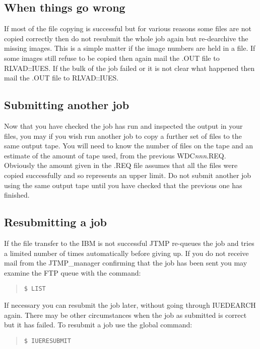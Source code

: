 \subsection {When things go wrong}

If most of the file copying is successful but
for various reasons some files are not copied correctly then do not resubmit the
whole job again but re-dearchive the missing images. This is a simple matter
if the image numbers are held in a file. If some images still refuse
to be copied then again mail the .OUT file to RLVAD::IUES.
If the bulk of the job failed or it is not clear what happened then mail the
.OUT file to RLVAD::IUES.

\subsection {Submitting another job}

Now that you have checked the job has run and inspected the output in your
files, you may if you wish run another job to copy a further set of files to
the same output tape. You will need to know the number of files on the tape
and an estimate of the amount of tape used, from the previous WDC{\it nnn}.REQ.
Obviously the amount given in the .REQ
file assumes that all the files were copied successfully and so represents an
upper limit.
Do not submit another job using the same output tape until you have checked 
that the previous one has finished. 

\subsection {Resubmitting a job}
\label{resubmit}

If the file transfer to the IBM is not successful
JTMP re-queues the job and tries a limited number of
times automatically before giving up.
If you do not receive mail from the JTMP\_manager confirming that the job
has been sent you may examine the FTP queue with the command:

\begin{quote}
{\tt \$ LIST}
\end{quote}

If necessary you can resubmit the job later, without
going through IUEDEARCH again. There may be other circumstances when the job as
submitted is correct but it has failed.
To resubmit a job use the global command:

\begin{quote}
{\tt \$ IUERESUBMIT}
\end{quote}

